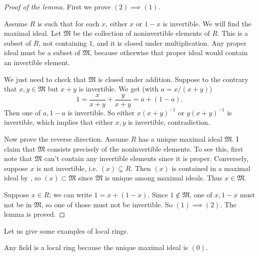 \begin{proof}[Proof of the lemma]
First we prove $(2) \implies (1)$.

Assume $R$ is such that for
each $x$, either $x$ or $1-x$ is invertible.  We will find the maximal ideal.
Let $\mathfrak{M} $ be the collection of noninvertible elements of $R$. This is
a subset of $R$, not containing $1$,  and it is closed under multiplication.
Any proper ideal must be a subset of $\mathfrak{M}$, because otherwise that
proper ideal would contain an invertible element.

We just need to check that $\mathfrak{M}$ is closed under addition.
Suppose to the
contrary that $x, y \in \mathfrak{M}$ but $x+y$ is invertible.   We get (with
$a = x/(x+y)$)
\[ 1 = \frac{x}{x+y} + \frac{y}{x+y} =a+(1-a). \]
Then one of $a,1-a$ is invertible. So either $x(x+y)^{-1}$  or $y(x+y)^{-1}$ is
invertible, which implies that either $x,y$ is invertible, contradiction.

Now prove the reverse direction. Assume $R$ has a unique maximal ideal
$\mathfrak{M}$.  I claim that $\mathfrak{M}$ consists precisely of the
noninvertible elements.  To see this, first note that $\mathfrak{M}$
can't contain any invertible elements since it is proper.  Conversely, suppose
$x$ is not invertible, i.e. $(x) \subsetneq R$.  Then $(x)$ is contained in a
maximal ideal by ,  so $(x) \subset
\mathfrak{M}$ since $\mathfrak{M}$ is unique among maximal ideals.
Thus $x \in \mathfrak{M}$.

Suppose $x \in R$; we can write $1 = x + (1-x)$. Since $1 \notin \mathfrak{M}$,
one of $x, 1-x$ must not be in $\mathfrak{M}$, so one of those must not be
invertible. So $(1) \implies (2)$.   The lemma is proved.
\end{proof}

Let us give some examples of local rings.

\begin{example}
Any field is a local ring because the unique maximal ideal is $(0)$.
\end{example}

